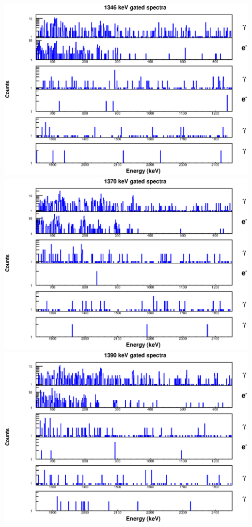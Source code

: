 \begin{landscape}
\includegraphics[scale=1.1]{154Gd_Appendix/1346_combined.eps}
\includegraphics[scale=1.1]{154Gd_Appendix/1370_combined.eps}
\includegraphics[scale=1.1]{154Gd_Appendix/1390_combined.eps}

\end{landscape}
